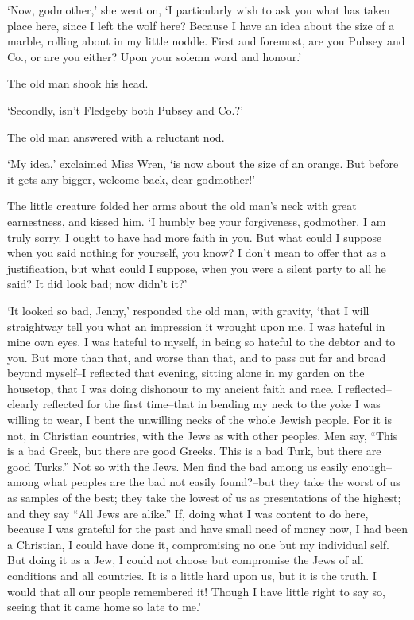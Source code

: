 ‘Now, godmother,’ she went on, ‘I particularly wish to ask you what has
taken place here, since I left the wolf here? Because I have an idea
about the size of a marble, rolling about in my little noddle. First and
foremost, are you Pubsey and Co., or are you either? Upon your solemn
word and honour.’

The old man shook his head.

‘Secondly, isn’t Fledgeby both Pubsey and Co.?’

The old man answered with a reluctant nod.

‘My idea,’ exclaimed Miss Wren, ‘is now about the size of an orange. But
before it gets any bigger, welcome back, dear godmother!’

The little creature folded her arms about the old man’s neck with great
earnestness, and kissed him. ‘I humbly beg your forgiveness, godmother.
I am truly sorry. I ought to have had more faith in you. But what could
I suppose when you said nothing for yourself, you know? I don’t mean to
offer that as a justification, but what could I suppose, when you were a
silent party to all he said? It did look bad; now didn’t it?’

‘It looked so bad, Jenny,’ responded the old man, with gravity, ‘that I
will straightway tell you what an impression it wrought upon me. I was
hateful in mine own eyes. I was hateful to myself, in being so hateful
to the debtor and to you. But more than that, and worse than that,
and to pass out far and broad beyond myself--I reflected that evening,
sitting alone in my garden on the housetop, that I was doing dishonour
to my ancient faith and race. I reflected--clearly reflected for the
first time--that in bending my neck to the yoke I was willing to wear,
I bent the unwilling necks of the whole Jewish people. For it is not, in
Christian countries, with the Jews as with other peoples. Men say, “This
is a bad Greek, but there are good Greeks. This is a bad Turk, but there
are good Turks.” Not so with the Jews. Men find the bad among us easily
enough--among what peoples are the bad not easily found?--but they take
the worst of us as samples of the best; they take the lowest of us as
presentations of the highest; and they say “All Jews are alike.” If,
doing what I was content to do here, because I was grateful for the past
and have small need of money now, I had been a Christian, I could have
done it, compromising no one but my individual self. But doing it as a
Jew, I could not choose but compromise the Jews of all conditions and
all countries. It is a little hard upon us, but it is the truth. I would
that all our people remembered it! Though I have little right to say so,
seeing that it came home so late to me.’

